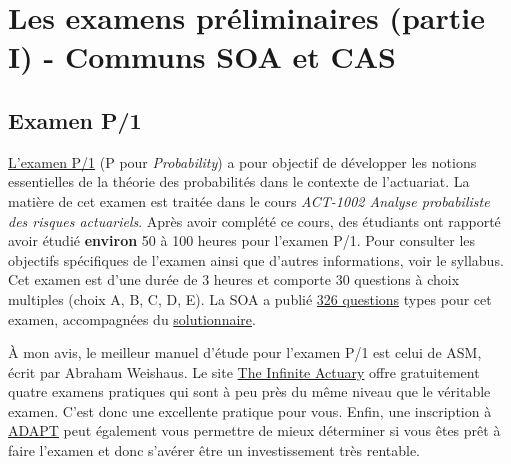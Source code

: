\section*{Les examens préliminaires (partie I) - Communs SOA et CAS}
\label{sec:prelims}

\subsection*{Examen P/1}
\label{subsec:examp}
\href{https://www.soa.org/education/exam-req/edu-exam-p-detail.aspx}{L'examen P/1} (P pour \textit{Probability}) a pour objectif de développer les notions essentielles de la théorie des probabilités dans le contexte de l'actuariat. La matière de cet examen est traitée dans le cours \textit{ACT-1002 Analyse probabiliste des risques actuariels}. Après avoir complété ce cours, des étudiants ont rapporté avoir étudié \textbf{environ} 50 à 100 heures pour l'examen P/1. Pour consulter les objectifs spécifiques de l'examen ainsi que d'autres informations, voir le syllabus. Cet examen est d'une durée de 3 heures et comporte 30 questions à choix multiples (choix A, B, C, D, E). La SOA a publié \href{http://www.soa.org/Files/Edu/edu-exam-p-sample-quest.pdf}{326 questions} types pour cet examen, accompagnées du \href{http://www.soa.org/Files/Edu/edu-exam-p-sample-sol.pdf}{solutionnaire}.\vspace{\baselineskip}

À mon avis, le meilleur manuel d'étude pour l'examen P/1 est celui de ASM, écrit par Abraham Weishaus. Le site \href{http://www.theinfiniteactuary.com/exams/1}{The Infinite Actuary} offre gratuitement quatre examens pratiques qui sont à peu près du même niveau que le véritable examen. C'est donc une excellente pratique pour vous. Enfin, une inscription à \href{https://www.coachingactuaries.com/}{ADAPT} peut également vous permettre de mieux déterminer si vous êtes prêt à faire l'examen et donc s'avérer être un investissement très rentable.\vspace{\baselineskip}

